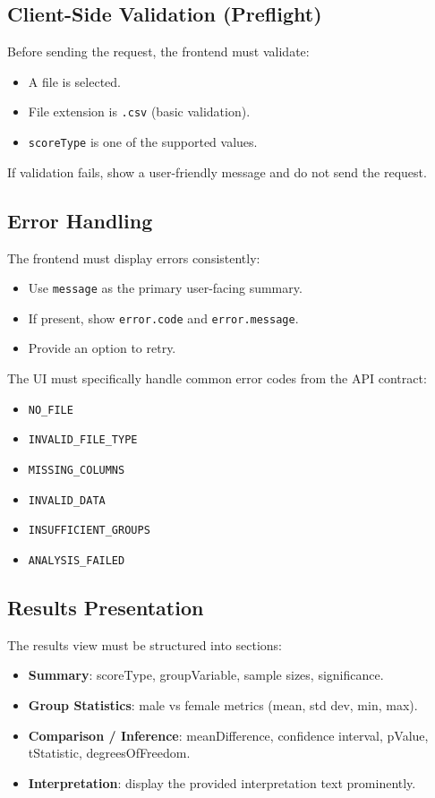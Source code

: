 \documentclass[12pt,a4paper]{article}
\begin{document}
\subsection{Client-Side Validation (Preflight)}

Before sending the request, the frontend must validate:
\begin{itemize}
    \item A file is selected.
    \item File extension is \texttt{.csv} (basic validation).
    \item \texttt{scoreType} is one of the supported values.
\end{itemize}

If validation fails, show a user-friendly message and do not send the request.

\subsection{Error Handling}

The frontend must display errors consistently:
\begin{itemize}
    \item Use \texttt{message} as the primary user-facing summary.
    \item If present, show \texttt{error.code} and \texttt{error.message}.
    \item Provide an option to retry.
\end{itemize}

The UI must specifically handle common error codes from the API contract:
\begin{itemize}
    \item \texttt{NO\_FILE}
    \item \texttt{INVALID\_FILE\_TYPE}
    \item \texttt{MISSING\_COLUMNS}
    \item \texttt{INVALID\_DATA}
    \item \texttt{INSUFFICIENT\_GROUPS}
    \item \texttt{ANALYSIS\_FAILED}
\end{itemize}

\subsection{Results Presentation}

The results view must be structured into sections:
\begin{itemize}
    \item \textbf{Summary}: scoreType, groupVariable, sample sizes, significance.
    \item \textbf{Group Statistics}: male vs female metrics (mean, std dev, min, max).
    \item \textbf{Comparison / Inference}: meanDifference, confidence interval, pValue, tStatistic, degreesOfFreedom.
    \item \textbf{Interpretation}: display the provided interpretation text prominently.
\end{itemize}
\end{document}
